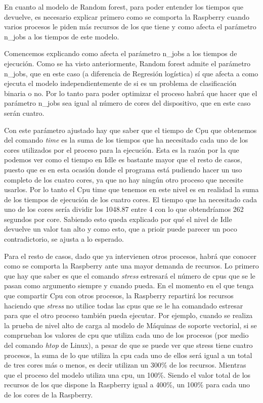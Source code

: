 \documentclass[a4paper, 12pt]{book}
\begin{document}
En cuanto al modelo de Random forest, para poder entender los tiempos que devuelve, es necesario explicar primero como se comporta la Raspberry cuando varios procesos le piden más recursos de los que tiene y como afecta el parámetro n\_jobs a los tiempos de este modelo.

Comencemos explicando como afecta el parámetro n\_jobs a los tiempos de ejecución. Como se ha visto anteriormente, Random forest admite el parámetro n\_jobs, que en este caso (a diferencia de Regresión logística) sí que afecta a como ejecuta el modelo independientemente de si es un problema de clasificación binaria o no. Por lo tanto para poder optimizar el proceso habrá que hacer que el parámetro n\_jobs sea igual al número de cores del dispositivo, que en este caso serán cuatro. 

Con este parámetro ajustado hay que saber que el tiempo de Cpu que obtenemos del comando \textit{time} es la suma de los tiempos que ha necesitado cada uno de los cores utilizados por el proceso para la ejecución. Esta es la razón por la que podemos ver como el tiempo en Idle es bastante mayor que el resto de casos, puesto que es en esta ocasión donde el programa está pudiendo hacer un uso completo de los cuatro cores, ya que no hay ningún otro proceso que necesite usarlos. Por lo tanto el Cpu time que tenemos en este nivel es en realidad la suma de los tiempos de ejecución de los cuatro cores. El tiempo que ha necesitado cada uno de los cores sería dividir los 1048.87 entre 4 con lo que obtendríamos 262 segundos por core. Sabiendo esto queda explicado por qué el nivel de Idle devuelve un valor tan alto y como esto, que a prioir puede parecer un poco contradictorio, se ajusta a lo esperado.

Para el resto de casos, dado que ya intervienen otros procesos, habrá que conocer como se comporta la Raspberry ante una mayor demanda de recursos. Lo primero que hay que saber es que el comando \textit{stress} estresará el número de cpus que se le pasan como argumento siempre y cuando pueda. En el momento en el que tenga que compartir Cpu con otros procesos, la Raspberry repartirá los recursos haciendo que \textit{stress} no utilice todas las cpus que se le ha comandado estresar para que el otro proceso también pueda ejecutar. Por ejemplo, cuando se realiza la prueba de nivel alto de carga al modelo de Máquinas de soporte vectorial, si se comprueban los valores de cpu que utiliza cada uno de los procesos (por medio del comando \textit{htop} de Linux), a pesar de que se puede ver que stress tiene cuatro procesos, la suma de lo que utiliza la cpu cada uno de ellos será igual a un total de tres cores más o menos, es decir utilizan un 300\% de los recursos. Mientras que el proceso del modelo utiliza una cpu, un 100\%. Siendo el valor total de los recursos de los que dispone la Raspberry igual a 400\%, un 100\% para cada uno de los cores de la Raspberry.
\end{document}
